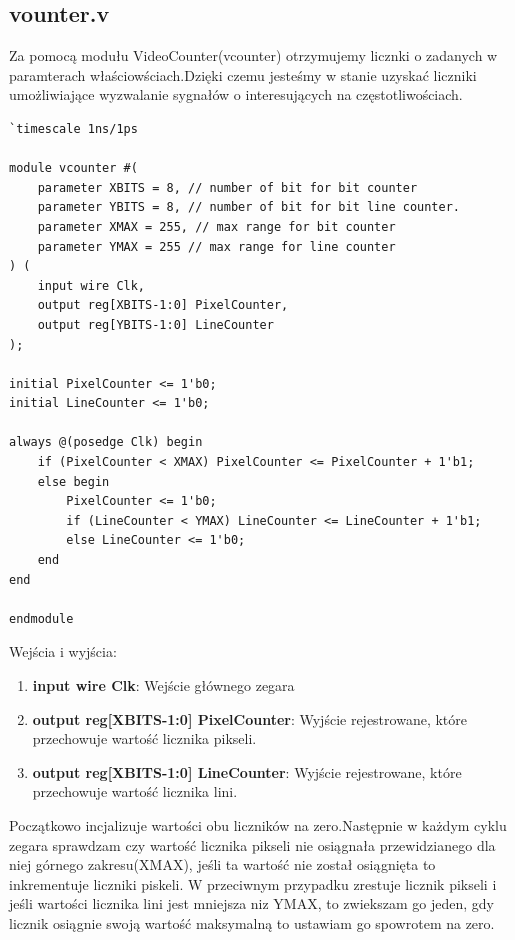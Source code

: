 \documentclass[12pt, a4paper]{article}
\begin{document}
\subsection{vounter.v}
Za pomocą modułu VideoCounter(vcounter) otrzymujemy licznki o zadanych w paramterach właściowściach.Dzięki czemu jesteśmy w stanie uzyskać liczniki umożliwiające wyzwalanie sygnałów o interesujących na częstotliwościach.
\begin{lstlisting}[style=prettyverilog,caption={Moduł vcounter.v}]
`timescale 1ns/1ps

module vcounter #(
    parameter XBITS = 8, // number of bit for bit counter
    parameter YBITS = 8, // number of bit for bit line counter.
    parameter XMAX = 255, // max range for bit counter
    parameter YMAX = 255 // max range for line counter
) (
    input wire Clk,
    output reg[XBITS-1:0] PixelCounter,
    output reg[YBITS-1:0] LineCounter
);

initial PixelCounter <= 1'b0;
initial LineCounter <= 1'b0;

always @(posedge Clk) begin
    if (PixelCounter < XMAX) PixelCounter <= PixelCounter + 1'b1;
    else begin
        PixelCounter <= 1'b0;
        if (LineCounter < YMAX) LineCounter <= LineCounter + 1'b1;
        else LineCounter <= 1'b0;
    end
end

endmodule
\end{lstlisting}
Wejścia i wyjścia:
\begin{enumerate}
    \item \textbf{\fontsize{11}{10}\selectfont input wire Clk}: Wejście głównego zegara
    \item \textbf{\fontsize{11}{10}\selectfont output reg[XBITS-1:0] PixelCounter}: Wyjście rejestrowane, które przechowuje wartość licznika pikseli.
    \item \textbf{\fontsize{11}{10}\selectfont output reg[XBITS-1:0] LineCounter}: Wyjście rejestrowane, które przechowuje wartość licznika lini.
\end{enumerate}
Początkowo incjalizuje wartości obu liczników na zero.Następnie w każdym cyklu zegara sprawdzam czy wartość licznika pikseli nie osiągnała przewidzianego dla niej górnego zakresu(XMAX), jeśli ta wartość nie został osiągnięta to inkrementuje liczniki piskeli. W przeciwnym przypadku zrestuje licznik pikseli i jeśli wartości licznika lini jest mniejsza niz YMAX, to zwiekszam go jeden, gdy licznik osiągnie swoją wartość maksymalną to ustawiam go spowrotem na zero.
\end{document}
